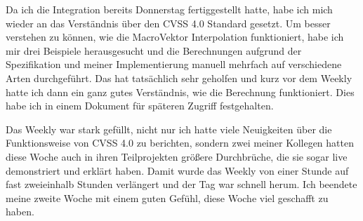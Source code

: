 
Da ich die Integration bereits Donnerstag fertiggestellt hatte, habe ich mich wieder an das Verständnis über den CVSS 4.0 Standard gesetzt.
Um besser verstehen zu können, wie die MacroVektor Interpolation funktioniert, habe ich mir drei Beispiele herausgesucht und die Berechnungen aufgrund der Spezifikation und meiner Implementierung manuell mehrfach auf verschiedene Arten durchgeführt.
Das hat tatsächlich sehr geholfen und kurz vor dem Weekly hatte ich dann ein ganz gutes Verständnis, wie die Berechnung funktioniert.
Dies habe ich in einem Dokument für späteren Zugriff festgehalten.

Das Weekly war stark gefüllt, nicht nur ich hatte viele Neuigkeiten über die Funktionsweise von CVSS 4.0 zu berichten, sondern zwei meiner Kollegen hatten diese Woche auch in ihren Teilprojekten größere Durchbrüche, die sie sogar live demonstriert und erklärt haben.
Damit wurde das Weekly von einer Stunde auf fast zweieinhalb Stunden verlängert und der Tag war schnell herum.
Ich beendete meine zweite Woche mit einem guten Gefühl, diese Woche viel geschafft zu haben.
